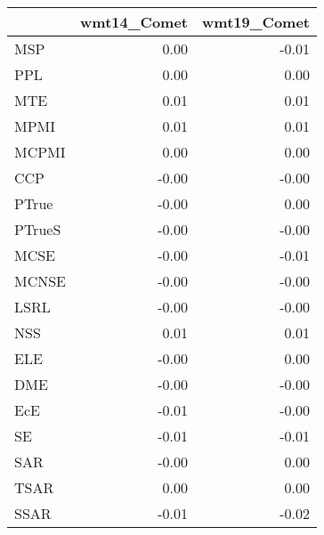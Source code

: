 \begin{tabular}{lrr}
\toprule
 & wmt14\_Comet & wmt19\_Comet \\
\midrule
MSP & 0.00 & -0.01 \\
PPL & 0.00 & 0.00 \\
MTE & 0.01 & 0.01 \\
MPMI & 0.01 & 0.01 \\
MCPMI & 0.00 & 0.00 \\
CCP & -0.00 & -0.00 \\
PTrue & -0.00 & 0.00 \\
PTrueS & -0.00 & -0.00 \\
MCSE & -0.00 & -0.01 \\
MCNSE & -0.00 & -0.00 \\
LSRL & -0.00 & -0.00 \\
NSS & 0.01 & 0.01 \\
ELE & -0.00 & 0.00 \\
DME & -0.00 & -0.00 \\
EcE & -0.01 & -0.00 \\
SE & -0.01 & -0.01 \\
SAR & -0.00 & 0.00 \\
TSAR & 0.00 & 0.00 \\
SSAR & -0.01 & -0.02 \\
\bottomrule
\end{tabular}
